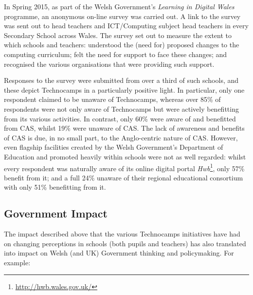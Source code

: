 \documentclass{llncs}
\begin{document}
In Spring 2015, as part of the Welsh Government's
\emph{Learning in Digital Wales} programme,
an anonymous on-line survey was carried out.
A link to the survey %
was sent out to head teachers and ICT/Computing subject head teachers
in every Secondary School across Wales.
The survey set out to measure the extent to which schools and teachers:
understood the (need for) proposed changes to the computing curriculum;
felt the need for support to face these changes;
and recognised the various organisations that were
providing such support.

Responses to the survey were submitted from over a third of such
schools, and these depict Technocamps in a particularly positive
light.  In particular, only one respondent claimed to be unaware of
Technocamps, whereas over 85\% of respondents were not only aware of
Technocamps but were actively benefitting from its various activities.
In contrast, only 60\% were aware of and benefitted from CAS, whilst
19\% were unaware of CAS. The lack of awareness and benefits of CAS is
due, in no small part, to the Anglo-centric nature of CAS.  However,
even flagship facilities created by the Welsh Government's Department
of Education and promoted heavily within schools were not as well
regarded: whilst every respondent was naturally aware of its online
digital portal {\emph{Hwb}}\footnote{\url{http://hwb.wales.gov.uk/}},
only 57\% benefit from it; and a full 24\% unaware of their regional
educational consortium with only 51\% benefitting from it.

\subsection{Government Impact}
\label{govrecog}

The impact described above that the various Technocamps initiatives
have had on changing perceptions in schools (both pupils and teachers)
has also translated into impact on Welsh (and UK) Government thinking
and policymaking. For example:
\end{document}
